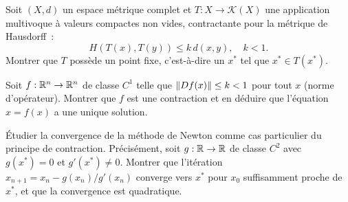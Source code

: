 \begin{exercice}
Soit $(X, d)$ un espace m\'etrique complet et $T : X \to \mathcal{K}(X)$ une
application multivoque \`a valeurs compactes non vides, contractante pour la
m\'etrique de Hausdorff~:
\[
    H(T(x), T(y)) \leq k \, d(x, y), \quad k < 1.
\]
Montrer que $T$ poss\`ede un point fixe, c'est-\`a-dire un $x^*$ tel que
$x^* \in T(x^*)$.
\end{exercice}

\begin{exercice}
Soit $f : \mathbb{R}^n \to \mathbb{R}^n$ de classe $C^1$ telle que $\left\| Df(x) \right\| \leq k < 1$
pour tout $x$ (norme d'op\'erateur). Montrer que $f$ est une contraction et en
d\'eduire que l'\'equation $x = f(x)$ a une unique solution.
\end{exercice}

\begin{exercice}
\'Etudier la convergence de la m\'ethode de Newton comme cas particulier du
principe de contraction. Pr\'ecis\'ement, soit $g : \mathbb{R} \to \mathbb{R}$ de classe $C^2$
avec $g(x^*) = 0$ et $g'(x^*) \neq 0$. Montrer que l'it\'eration
$x_{n+1} = x_n - g(x_n)/g'(x_n)$ converge vers $x^*$ pour $x_0$ suffisamment
proche de $x^*$, et que la convergence est quadratique.
\end{exercice}
